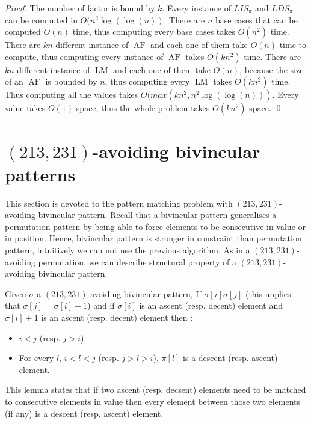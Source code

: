 \documentclass[a4paper]{llncs}
\newcommand{\ptext}{\pi}
\newcommand{\ppattern}{\sigma}
\newcounter{num}
\DeclareMathOperator{\LMa}{LM}
\DeclareMathOperator{\AFa}{AF}
\begin{document}
\begin{proof}
The number of factor is bound by $k$.
Every instance of $LIS_{\ptext}$ and $LDS_{\ptext}$ can be computed in $O(n^2\log(\log(n))$.
There are $n$ base cases that can be computed $O(n)$ time, thus computing every base cases
takes $O(n^2)$ time.
There are $kn$ different instance of $\AFa$ and each one of them take $O(n)$ time to compute, 
thus computing every instance of $\AFa$ takes $O(kn^2)$ time.
There are $kn$ different instance of $\LMa$ and each one of them take $O(n)$, because the size of an $\AFa$
is bounded by $n$, thus computing every $\LMa$ takes $O(kn^2)$ time.
Thus computing all the values takes $O(max(kn^2,n^2\log(\log(n)))$.
Every value takes $O(1)$ space, thus the whole problem takes $O(kn^2)$ space.
\qed
\end{proof}


\section{$(213,231)$-avoiding bivincular patterns}
	\label{section:bivincular}

This section is devoted to the pattern matching problem with $(213,231)$-avoiding bivincular pattern.
Recall that a bivincular pattern generalises a permutation pattern by
being able to force elements to be consecutive in value or in position.
Hence,  bivincular pattern is stronger in constraint than permutation pattern, intuitively we can not use the previous algorithm.
As in a $(213,231)$-avoiding permutation, we can describe structural property of a $(213,231)$-avoiding bivincular pattern.

\begin{lemma}
\label{lemma:ascentDescentAscent}
Given $\ppattern$ a $(213,231)$-avoiding bivincular pattern,
If $\overline{\sigma[i]\sigma[j]}$ (this implies that $\sigma[j]=\sigma[i]+1$) and 
if $\sigma[i]$ is an ascent (resp. decent) element and $\sigma[i]+1$ is an ascent 
(resp. decent) element then :  
\begin{itemize}
	\item $i<j$ (resp. $j>i$)
	\item For every $l$, $i<l<j$ (resp. $j>l>i$), $\pi[l]$ is a descent (resp. ascent) element.    
\end{itemize}

\end{lemma}

This lemma states that if two ascent (resp. decsent) elements
need to be matched to consecutive elements in value then every element between those two elements (if any) is a descent (resp. ascent) element. 
\end{document}
